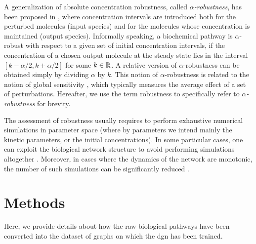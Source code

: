 A generalization of absolute concentration robustness, called \emph{$\alpha$-robustness}, has been proposed in \citep{nasti2018formalizing}, where concentration intervals are introduced both for the perturbed molecules (input species) and for the molecules whose concentration is maintained (output species). Informally speaking, a biochemical pathway is $\alpha$-robust with respect to a given set of initial concentration intervals, if the concentration of a chosen output molecule at the steady state lies in the interval $[k-\alpha/2,k+\alpha/2]$ for some $k \in \mathbb{R}$. A relative version of $\alpha$-robustness can be obtained simply by dividing $\alpha$ by $k$. This notion of $\alpha$-robustness is related to the notion of global sensitivity \citep{zi2011sensitivity}, which typically measures the average effect of a set of perturbations. Hereafter, we use the term robustness to specifically refer to \emph{$\alpha$-robustness} for brevity.

The assessment of robustness usually requires to perform exhaustive numerical simulations in parameter space \citep{rizk2009general,iooss2015review} (where by parameters we intend mainly the kinetic parameters, or the initial concentrations). In some particular cases, one can exploit the biological network structure to avoid performing simulations altogether \citep{shinar2010structural}. Moreover, in cases where the dynamics of the network are monotonic, the number of such simulations can be significantly reduced \citep{gori2019towards}.

\section{Methods}
Here, we provide details about how the raw biological pathways have been converted into the dataset of graphs on which the \gls{dgn} has been trained.

